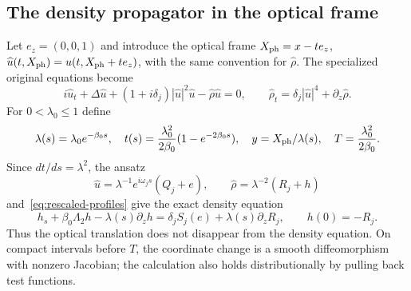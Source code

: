 \documentclass[11pt]{article}
\numberwithin{equation}{section}
\theoremstyle{remark}
\newcommand{\Lam}[1]{\Lambda_{#1}}
\begin{document}
\subsection{The density propagator in the optical frame}

Let $e_z=(0,0,1)$ and introduce the optical frame
$X_{\rm ph}=x-te_z$,
$\widehat u(t,X_{\rm ph})=u(t,X_{\rm ph}+te_z)$, with the same convention
for $\widehat\rho$. The specialized original equations become
\[
 i\widehat u_t+\Delta\widehat u
       +(1+i\delta_j)|\widehat u|^2\widehat u
       -\widehat\rho\widehat u=0,
 \qquad
 \widehat\rho_t=\delta_j|\widehat u|^4+\partial_z\widehat\rho.
\]
For $0<\lambda_0\le1$ define
\begin{equation}\label{eq:similarity}
 \lambda(s)=\lambda_0e^{-\beta_0s},\quad
 t(s)=\frac{\lambda_0^2}{2\beta_0}(1-e^{-2\beta_0s}),\quad
 y=X_{\rm ph}/\lambda(s),\quad T=\frac{\lambda_0^2}{2\beta_0}.
\end{equation}
Since $dt/ds=\lambda^2$, the ansatz
\begin{equation}\label{eq:ansatz}
 \widehat u=\lambda^{-1}e^{i\omega_js}(Q_j+e),\qquad
 \widehat\rho=\lambda^{-2}(R_j+h)
\end{equation}
and~\eqref{eq:rescaled-profiles} give the exact density equation
\begin{equation}\label{eq:h-equation}
 h_s+\beta_0\Lam2 h-\lambda(s)\partial_zh
     =\delta_j S_j(e)+\lambda(s)\partial_zR_j,
 \qquad h(0)=-R_j.
\end{equation}
Thus the optical translation does not disappear from the density equation.
On compact intervals before $T$, the coordinate change is a smooth
diffeomorphism with nonzero Jacobian; the calculation also holds
distributionally by pulling back test functions.
\end{document}
